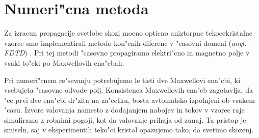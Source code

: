 \documentclass[12pt,twoside,openright,final,a4paper]{report}
\newcommand{\todo}[1]{(\textbf{\textsmaller{TODO}: #1})}
\newcommand{\angl}[1]{(\textit{angl. #1})}
\renewcommand{\acf}[1]{\aclu{#1} -- \acs{#1}}
\begin{document}

\chapter{Numeri"cna metoda}

Za izracun propagacije svetlobe skozi mocno opticno aniztorpne tekocekristalne vzorce smo implementirali metodo kon"cnih diferenc v "casovni domeni \angl{\acf{FDTD}} \cite{taflove}. 
Pri tej metodi "casovno propagiramo elektri"cno in magnetno polje v vsaki to"cki po Maxwellovih ena"cbah. 

Pri numeri"cnem re"sevanju potrebujemo le tisti dve Maxwellovi ena"cbi, ki vsebujeta "casovne odvode polj. 
Konsistenca Maxwellovih ena"cb zagotavlja, da "ce prvi dve ena"cbi dr"zita na za"cetku, bosta avtomatsko izpolnjeni ob vsakem "casu\cite{taflove}. 
Izvore valovanja namesto z dodajanjem nabojev in tokov v vzorec raje simuliramo z robnimi pogoji, kot da valovanje prihaja od zunaj. 
Ta pristop je smiseln, saj v eksperimentih teko"ci kristal opazujemo tako, da svetimo skozenj. 
\end{document}
